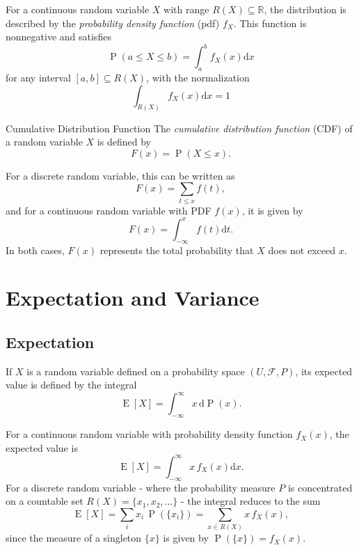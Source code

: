 \documentclass[10pt, headings=standardclasses, parskip=half, twoside]{scrartcl}
\newcommand{\dif}{\mathrm{d}}
\newcommand{\Prob}{\operatorname{P}}
\begin{document}
\begin{definition}{}
For a continuous random variable $X$ with range $R(X) \subseteq \mathbb{R}$, the distribution is described by the \textit{probability density function} (pdf) $f_{X}$. This function is nonnegative and satisfies
\[
\operatorname{P}(a \leq X \leq b)=\int_{a}^{b} f_{X}(x) \mathrm{d} x
\]
for any interval $[a, b] \subseteq R(X)$, with the normalization
\[
\int_{R(X)} f_{X}(x) \mathrm{d} x=1
\]
\end{definition}

\begin{definition}{Cumulative Distribution Function}{}
    The \textit{cumulative distribution function} (CDF) of a random variable $X$ is defined by
    \[
    F(x)=\operatorname{P}(X \leq x) .
    \]
\end{definition}

For a discrete random variable, this can be written as
\[
F(x)=\sum_{t \leq x} f(t),
\]
and for a continuous random variable with PDF $f(x)$, it is given by
\[
F(x)=\int_{-\infty}^{x} f(t) \mathrm{d} t .
\]
In both cases, $F(x)$ represents the total probability that $X$ does not exceed $x$.






\clearpage
\section{Expectation and Variance}

\subsection{Expectation}

\begin{definition}{}
    If $X$ is a random variable defined on a probability space $(U, \mathcal{F}, P)$, its expected value is defined by the integral
    \[
    \operatorname{E}[X]=\int_{-\infty}^{\infty} x \, \dif \Prob(x) .
    \]
\end{definition}

For a continuous random variable with probability density function $f_{X}(x)$, the expected value is
\[
\operatorname{E}[X]=\int_{-\infty}^{\infty} x \, f_{X}(x) \dif x.
\]
For a discrete random variable - where the probability measure $P$ is concentrated on a countable set $R(X)=\{x_{1}, x_{2}, \ldots\}$ - the integral reduces to the sum
\[
\operatorname{E}[X]=\sum_{i} x_{i} \, \operatorname{P}(\{x_{i}\})=\sum_{x \in R(X)} x \, f_{X}(x),
\]
since the measure of a singleton $\{x\}$ is given by $\operatorname{P}(\{x\})=f_{X}(x)$.
\end{document}
